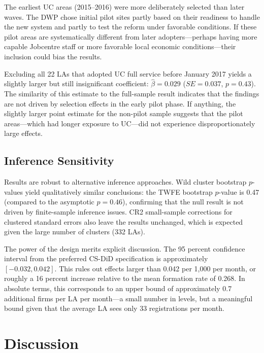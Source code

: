 \documentclass[12pt]{article}
\begin{document}
The earliest UC areas (2015--2016) were more deliberately selected than later waves. The DWP chose initial pilot sites partly based on their readiness to handle the new system and partly to test the reform under favorable conditions. If these pilot areas are systematically different from later adopters---perhaps having more capable Jobcentre staff or more favorable local economic conditions---their inclusion could bias the results.

Excluding all 22 LAs that adopted UC full service before January 2017 yields a slightly larger but still insignificant coefficient: $\hat{\beta} = 0.029$ ($SE = 0.037$, $p = 0.43$). The similarity of this estimate to the full-sample result indicates that the findings are not driven by selection effects in the early pilot phase. If anything, the slightly larger point estimate for the non-pilot sample suggests that the pilot areas---which had longer exposure to UC---did not experience disproportionately large effects.

\subsection{Inference Sensitivity}

Results are robust to alternative inference approaches. Wild cluster bootstrap $p$-values \citep{cameron2008bootstrap} yield qualitatively similar conclusions: the TWFE bootstrap $p$-value is 0.47 (compared to the asymptotic $p = 0.46$), confirming that the null result is not driven by finite-sample inference issues. CR2 small-sample corrections for clustered standard errors also leave the results unchanged, which is expected given the large number of clusters (332 LAs).

The power of the design merits explicit discussion. The 95 percent confidence interval from the preferred CS-DiD specification is approximately $[-0.032, 0.042]$. This rules out effects larger than 0.042 per 1,000 per month, or roughly a 16 percent increase relative to the mean formation rate of 0.268. In absolute terms, this corresponds to an upper bound of approximately 0.7 additional firms per LA per month---a small number in levels, but a meaningful bound given that the average LA sees only 33 registrations per month.


\section{Discussion}
\label{sec:discussion}
\end{document}

